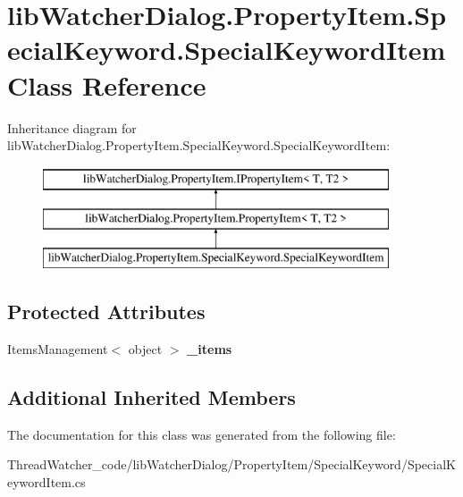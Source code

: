 \hypertarget{classlib_watcher_dialog_1_1_property_item_1_1_special_keyword_1_1_special_keyword_item}{\section{lib\+Watcher\+Dialog.\+Property\+Item.\+Special\+Keyword.\+Special\+Keyword\+Item Class Reference}
\label{classlib_watcher_dialog_1_1_property_item_1_1_special_keyword_1_1_special_keyword_item}
}
Inheritance diagram for lib\+Watcher\+Dialog.\+Property\+Item.\+Special\+Keyword.\+Special\+Keyword\+Item\+:\begin{figure}[H]
\begin{center}
\leavevmode
\includegraphics[height=3.000000cm]{classlib_watcher_dialog_1_1_property_item_1_1_special_keyword_1_1_special_keyword_item}
\end{center}
\end{figure}
\subsection*{Protected Attributes}
\begin{DoxyCompactItemize}
\item 
\hypertarget{classlib_watcher_dialog_1_1_property_item_1_1_special_keyword_1_1_special_keyword_item_a3f18f012ed4c89cba0b006bc8cfa9c98}{Items\+Management$<$ object $>$ {\bfseries \+\_\+items}}\label{classlib_watcher_dialog_1_1_property_item_1_1_special_keyword_1_1_special_keyword_item_a3f18f012ed4c89cba0b006bc8cfa9c98}

\end{DoxyCompactItemize}
\subsection*{Additional Inherited Members}


The documentation for this class was generated from the following file\+:\begin{DoxyCompactItemize}
\item 
Thread\+Watcher\+\_\+code/lib\+Watcher\+Dialog/\+Property\+Item/\+Special\+Keyword/Special\+Keyword\+Item.\+cs\end{DoxyCompactItemize}
